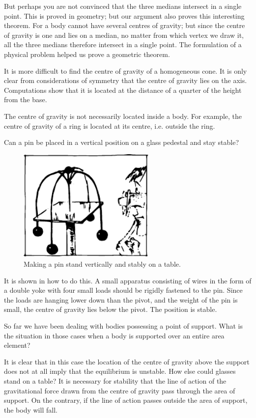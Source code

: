 But perhaps you are not convinced that the three medians intersect in a single point. This is proved in geometry; but our argument also proves this interesting theorem. For a body cannot have several centres of gravity; but since the centre of gravity is one and lies on a median, no matter from which vertex we draw it, all the three medians therefore intersect in a single point. The
formulation of a physical problem helped us prove a geometric theorem.

It is more difficult to find the centre of gravity of a homogeneous cone. It is only clear from considerations of symmetry that the centre of gravity lies on the axis. Computations show that it is located at the distance of a quarter of the height from the base.

The centre of gravity is not necessarily located inside a body. For example, the centre of gravity of a ring is located at its centre, i.e. outside the ring.

Can a pin be placed in a vertical position on a glass pedestal and stay stable?
 \begin{figure}[!ht]
 \centering
 \includegraphics[width=0.6\textwidth]{figures/fig-5-09.pdf}
 \caption{Making a pin stand vertically and stably on a table.}
 \label{fig-5-09}
 \end{figure}
It is shown in  how to do this. A small apparatus consisting of wires in the form of a double yoke with four small loads should be rigidly fastened to the pin. Since the loads are hanging lower down than the pivot, and the weight of the pin is small, the centre of gravity lies below the pivot. The position is stable.

So far we have been dealing with bodies possessing a point of support. What is the situation in those cases when a body is supported over an entire area element?

It is clear that in this case the location of the centre of gravity above the support does not at all imply that the equilibrium is unstable. How else could glasses stand on a table? It is necessary for stability that the line of action of the gravitational force drawn from the centre of gravity pass through the area of support. On the contrary, if the line of action passes outside the area of support, the body will fall.

